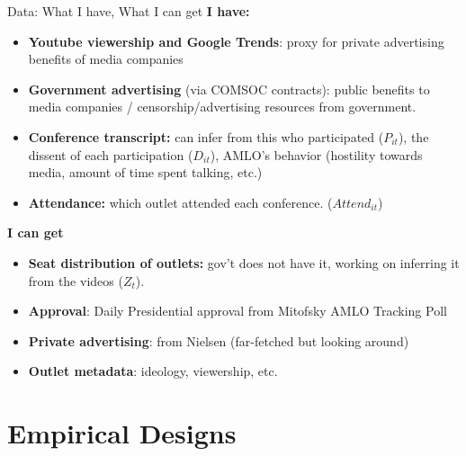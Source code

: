 \documentclass[10pt,aspectratio=169]{beamer}
\begin{document}
\begin{frame}{Data: What I have, What I can get}
\small
\textbf{I have:}
\begin{itemize}\setlength\itemsep{0.35em}
    \item \textbf{Youtube viewership and Google Trends}: proxy for private advertising benefits of media companies 
    \item \textbf{Government advertising} (via COMSOC contracts): public benefits to media companies / censorship/advertising resources from government. 
    
    \item \textbf{Conference transcript:} can infer from this who participated ($P_{it}$), the \alert{dissent} of each participation ($D_{it}$), AMLO's behavior (hostility towards media, amount of time spent talking, etc.)

    \item \textbf{Attendance:} which outlet attended each conference. ($Attend_{it}$)
\end{itemize}
\textbf{I can get}
\begin{itemize}\setlength\itemsep{0.35em}
    \item \textbf{Seat distribution of outlets:} gov't does not have it, working on inferring it from the videos ($Z_{t}$).
    \item \textbf{Approval}: Daily Presidential approval from Mitofsky AMLO Tracking Poll
    \item \textbf{Private advertising}: from Nielsen (far-fetched but looking around)
    \item \textbf{Outlet metadata}: ideology, viewership, etc. 
\end{itemize}
\end{frame}

\section{Empirical Designs}
\end{document}
